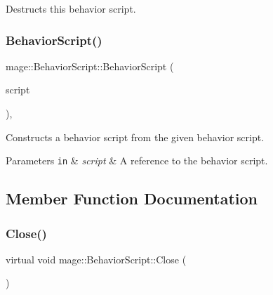 Destructs this behavior script. \hypertarget{classmage_1_1_behavior_script_a776701dc960610d3a08679bc01e1def5}{}\label{classmage_1_1_behavior_script_a776701dc960610d3a08679bc01e1def5} 
\subsubsection{\texorpdfstring{Behavior\+Script()}{BehaviorScript()}\hspace{0.1cm}{\footnotesize\ttfamily [2/2]}}
{\footnotesize\ttfamily mage\+::\+Behavior\+Script\+::\+Behavior\+Script (\begin{DoxyParamCaption}\item[{const \hyperlink{classmage_1_1_behavior_script}{Behavior\+Script} \&}]{script }\end{DoxyParamCaption})\hspace{0.3cm}{\ttfamily [private]}, {\ttfamily [delete]}}

Constructs a behavior script from the given behavior script.


\begin{DoxyParams}[1]{Parameters}
\mbox{\tt in}  & {\em script} & A reference to the behavior script. \\
\hline
\end{DoxyParams}


\subsection{Member Function Documentation}
\hypertarget{classmage_1_1_behavior_script_a58397c708ec04ca09983bb20cfc0afbe}{}\label{classmage_1_1_behavior_script_a58397c708ec04ca09983bb20cfc0afbe} 
\subsubsection{\texorpdfstring{Close()}{Close()}}
{\footnotesize\ttfamily virtual void mage\+::\+Behavior\+Script\+::\+Close (\begin{DoxyParamCaption}{ }\end{DoxyParamCaption})\hspace{0.3cm}{\ttfamily [virtual]}}

